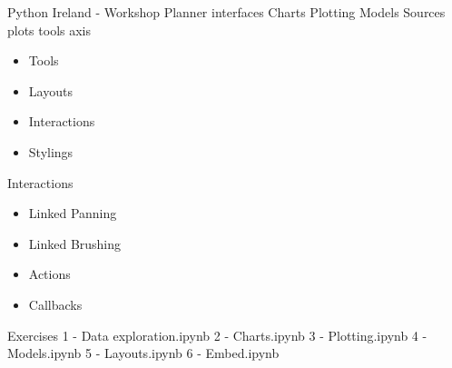 Python Ireland - Workshop Planner
interfaces
Charts
Plotting
Models
 Sources
 plots
 tools
 axis


\begin{itemize}
\item Tools
\item Layouts 
\item Interactions 
\item Stylings
\end{itemize}


Interactions
\begin{itemize}
\item Linked Panning
\item Linked Brushing
\item Actions
\item Callbacks
\end{itemize}


Exercises
1 - Data exploration.ipynb
2 - Charts.ipynb
3 - Plotting.ipynb
4 - Models.ipynb
5 - Layouts.ipynb
6 - Embed.ipynb

